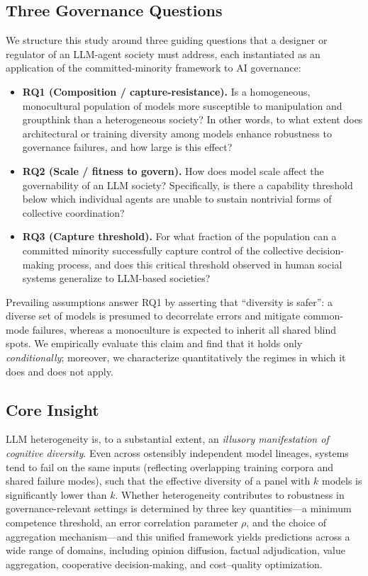 \documentclass[manuscript,screen,review]{acmart}
\begin{document}
\subsection{Three Governance Questions}
We structure this study around three guiding questions that a designer or regulator of an LLM-agent society must address, each instantiated as an application of the committed-minority framework to AI governance:
\begin{itemize}
\item \textbf{RQ1 (Composition / capture-resistance).} Is a homogeneous, monocultural population of models more susceptible to manipulation and groupthink than a heterogeneous society? In other words, to what extent does architectural or training diversity among models enhance robustness to governance failures, and how large is this effect?
\item \textbf{RQ2 (Scale / fitness to govern).} How does model scale affect the governability of an LLM society? Specifically, is there a capability threshold below which individual agents are unable to sustain nontrivial forms of collective coordination?
\item \textbf{RQ3 (Capture threshold).} For what fraction of the population can a committed minority successfully capture control of the collective decision-making process, and does this critical threshold observed in human social systems generalize to LLM-based societies?
\end{itemize}
Prevailing assumptions answer RQ1 by asserting that ``diversity is safer'': a diverse set of models is presumed to decorrelate errors and mitigate common-mode failures, whereas a monoculture is expected to inherit all shared blind spots. We empirically evaluate this claim and find that it holds only \emph{conditionally}; moreover, we characterize quantitatively the regimes in which it does and does not apply.

\subsection{Core Insight}
LLM heterogeneity is, to a substantial extent, an \emph{illusory manifestation of cognitive diversity}. Even across ostensibly independent model lineages, systems tend to fail on the same inputs (reflecting overlapping training corpora and shared failure modes), such that the effective diversity of a panel with $k$ models is significantly lower than $k$. Whether heterogeneity contributes to robustness in governance-relevant settings is determined by three key quantities—a minimum competence threshold, an error correlation parameter $\rho$, and the choice of aggregation mechanism—and this unified framework yields predictions across a wide range of domains, including opinion diffusion, factual adjudication, value aggregation, cooperative decision-making, and cost–quality optimization.
\end{document}
